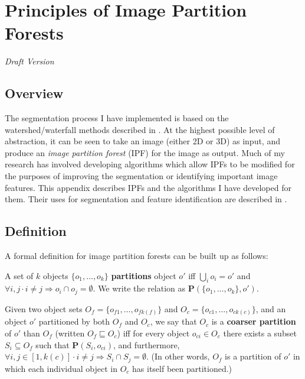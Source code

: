 \chapter{Principles of Image Partition Forests}
\label{chap:ipfs}

\emph{Draft Version}

\section{Overview}

The segmentation process I have implemented is based on the watershed/waterfall methods described in \cite{meijster98,marcotegui05}. At the highest possible level of abstraction, it can be seen to take an image (either 2D or 3D) as input, and produce an \emph{image partition forest} (IPF) for the image as output. Much of my research has involved developing algorithms which allow IPFs to be modified for the purposes of improving the segmentation or identifying important image features. This appendix describes IPFs and the algorithms I have developed for them. Their uses for segmentation and feature identification are described in \cite{gvccimi08,gvcispa09}.


\section{Definition}

A formal definition for image partition forests can be built up as follows:

\begin{definition}
A set of $k$ objects $\{o_1,\ldots,o_k\}$ \textbf{partitions} object $o'$ iff $\bigcup_i o_i = o'$ and $\forall i,j \cdot i \ne j \Rightarrow o_i \cap o_j = \emptyset$. We write the relation as $\mathbf{P}(\{o_1,\ldots,o_k\},o')$.
\end{definition}


\begin{definition}
Given two object sets $O_f = \{o_{f1},\ldots,o_{fk(f)}\}$ and $O_c = \{o_{c1},\ldots,o_{ck(c)}\}$, and an object $o'$ partitioned by both $O_f$ and $O_c$, we say that $O_c$ is a \textbf{coarser partition} of $o'$ than $O_f$ (written $O_f \sqsubseteq O_c$) iff for every object $o_{ci} \in O_c$ there exists a subset $S_i \subseteq O_f$ such that $\mathbf{P}(S_i, o_{ci})$, and furthermore, $\forall i,j \in [1,k(c)] \cdot i \ne j \Rightarrow S_i \cap S_j = \emptyset$. (In other words, $O_f$ is a partition of $o'$ in which each individual object in $O_c$ has itself been partitioned.)
\end{definition}

